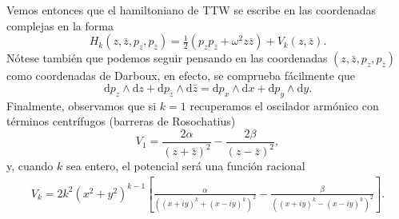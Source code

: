 \documentclass[12pt,a4paper,twoside]{article}
\theoremstyle{definition} \newtheorem{defn}[thm]{Definición}
\theoremstyle{definition} \newtheorem{ejemplo}[thm]{Ejemplo}
\theoremstyle{definition} \newtheorem{ejercicio}[thm]{Ejercicio}
\theoremstyle{remark} \newtheorem*{obs}{Observación}
\def\dd{\mathrm{d}}
\def\zz{\bar{z}}
\begin{document}
Vemos entonces que el hamiltoniano de TTW se escribe en las coordenadas complejas en la forma
\begin{equation}
  H_k(z,\zz,p_z,p_{\zz})=\tfrac{1}{2}(p_zp_{\zz}+\omega^2 z \zz) + V_k(z,\zz).
\end{equation}
Nótese también que podemos seguir pensando en las coordenadas $(z,\zz,p_z,p_{\zz})$ como coordenadas de Darboux, en efecto, se comprueba fácilmente que
\begin{equation}
  \dd p_z \wedge \dd z + \dd p_{\zz} \wedge \dd \zz=\dd p_x \wedge \dd x + \dd p_y \wedge \dd y.
\end{equation}
Finalmente, observamos que si $k=1$ recuperamos el oscilador armónico con términos centrífugos (barreras de Rosochatius)
\begin{equation}
  V_1=\frac{2\alpha}{(z+\zz)^2}-\frac{2\beta}{(z-\zz)^2},
\end{equation}
y, cuando $k$ sea entero, el potencial será una función racional
\begin{align}
  V_k=2k^2(x^2+y^2)^{k-1}\left[ \frac{\alpha}{\left( (x+iy)^k+(x-iy)^k \right)^2}-\frac{\beta}{\left( (x+iy)^k-(x-iy)^k \right)^2} \right].
\end{align}
\end{document}
